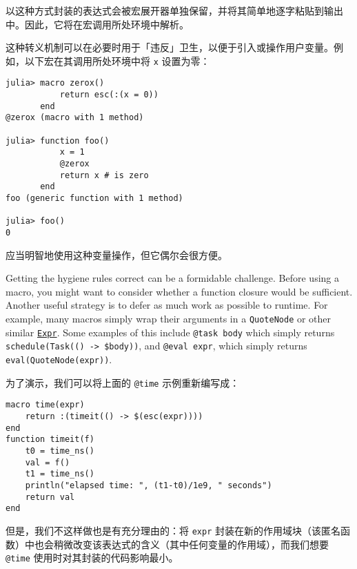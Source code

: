 以这种方式封装的表达式会被宏展开器单独保留，并将其简单地逐字粘贴到输出中。因此，它将在宏调用所处环境中解析。



这种转义机制可以在必要时用于「违反」卫生，以便于引入或操作用户变量。例如，以下宏在其调用所处环境中将 \texttt{x} 设置为零：




\begin{verbatim}
julia> macro zerox()
           return esc(:(x = 0))
       end
@zerox (macro with 1 method)

julia> function foo()
           x = 1
           @zerox
           return x # is zero
       end
foo (generic function with 1 method)

julia> foo()
0
\end{verbatim}



应当明智地使用这种变量操作，但它偶尔会很方便。



Getting the hygiene rules correct can be a formidable challenge. Before using a macro, you might want to consider whether a function closure would be sufficient. Another useful strategy is to defer as much work as possible to runtime. For example, many macros simply wrap their arguments in a \texttt{QuoteNode} or other similar \hyperlink{17120496304147995299}{\texttt{Expr}}. Some examples of this include \texttt{@task body} which simply returns \texttt{schedule(Task(() -> \$body))}, and \texttt{@eval expr}, which simply returns \texttt{eval(QuoteNode(expr))}.



为了演示，我们可以将上面的 \texttt{@time} 示例重新编写成：




\begin{verbatim}
macro time(expr)
    return :(timeit(() -> $(esc(expr))))
end
function timeit(f)
    t0 = time_ns()
    val = f()
    t1 = time_ns()
    println("elapsed time: ", (t1-t0)/1e9, " seconds")
    return val
end
\end{verbatim}



但是，我们不这样做也是有充分理由的：将 \texttt{expr} 封装在新的作用域块（该匿名函数）中也会稍微改变该表达式的含义（其中任何变量的作用域），而我们想要 \texttt{@time} 使用时对其封装的代码影响最小。



\hypertarget{11371303288264026631}{}


